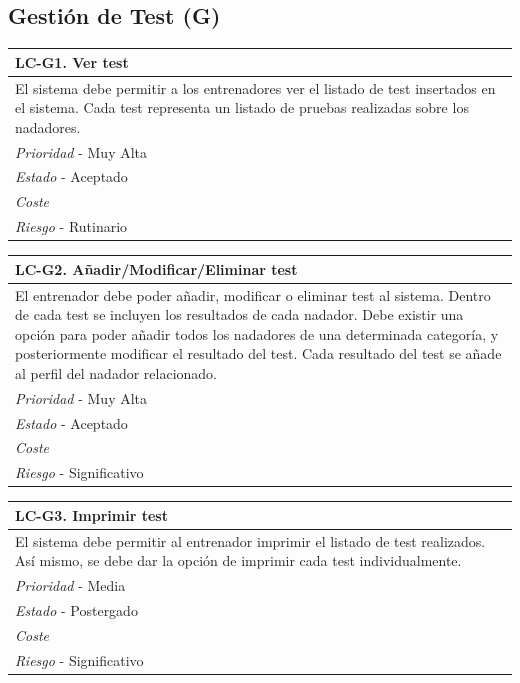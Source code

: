 %
%
\subsection{Gestión de Test (G)} %
	\label{sub:gestion_de_test}

	\begin{center}
		\begin{tabularx}{15cm}{|X|}
			\hline 
				\bf{LC-G1. Ver test}\\
			\hline
				El sistema debe permitir a los entrenadores ver el listado de test insertados en el sistema. Cada test representa un listado de pruebas realizadas sobre los nadadores.\\
			\hline
				{\it Prioridad} - Muy Alta\\
			\hline
				{\it Estado} - Aceptado\\
			\hline
				{\it Coste}\\
			\hline
				{\it Riesgo} - Rutinario\\
			\hline
		\end{tabularx}
	\end{center}
	
	\begin{center}
		\begin{tabularx}{15cm}{|X|}
			\hline 
				\bf{LC-G2. Añadir/Modificar/Eliminar test}\\
			\hline
				El entrenador debe poder añadir, modificar o eliminar test al sistema. Dentro de cada test se incluyen los resultados de cada nadador. Debe existir una opción para poder añadir todos los nadadores de una determinada categoría, y posteriormente modificar el resultado del test. Cada resultado del test se añade al perfil del nadador relacionado.\\
			\hline
				{\it Prioridad} - Muy Alta\\
			\hline
				{\it Estado} - Aceptado\\
			\hline
				{\it Coste}\\
			\hline
				{\it Riesgo} - Significativo\\
			\hline
		\end{tabularx}
	\end{center}
	
	\begin{center}
		\begin{tabularx}{15cm}{|X|}
			\hline 
				\bf{LC-G3. Imprimir test}\\
			\hline
				El sistema debe permitir al entrenador imprimir el listado de test realizados. Así mismo, se debe dar la opción de imprimir cada test individualmente.\\
			\hline
				{\it Prioridad} - Media\\
			\hline
				{\it Estado} - Postergado\\
			\hline
				{\it Coste}\\
			\hline
				{\it Riesgo} - Significativo\\
			\hline
		\end{tabularx}
	\end{center}
	
